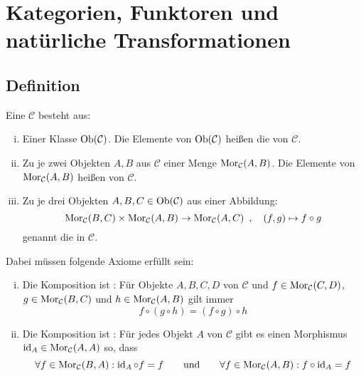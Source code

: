 \tableofcontents
\cleardoubleoddemptypage

\setcounter{page}{1}

\section{Kategorien, Funktoren und natürliche Transformationen} %
\label{sec:1}

\subsection[Definition: Kategorie]{Definition} %
\label{sub:11}
Eine  $\mathcal{C}$ besteht aus:
\begin{enumerate}[i)]
	\item Einer Klasse $\operatorname{Ob}(\mathcal{C})$. Die Elemente von $\operatorname{Ob}(\mathcal{C})$ heißen die  von $\mathcal{C}$.
	\item Zu je zwei Objekten $A,B$ aus $\mathcal{C}$ einer Menge $\operatorname{Mor}_{\mathcal{C}}(A,B)$. Die Elemente von $\operatorname{Mor}_\mathcal{C}(A,B)$ heißen  von
	$\mathcal{C}$.
	\item Zu je drei Objekten $A,B,C \in \operatorname{Ob}(\mathcal{C})$ aus einer Abbildung: 
	\[
		\operatorname{Mor}_\mathcal{C}(B,C) \times \operatorname{Mor}_\mathcal{C}(A,B) \to \operatorname{Mor}_\mathcal{C}(A,C) \enspace, \quad (f,g) \mapsto f \circ g
	\]
	genannt die  in $\mathcal{C}$. 
\end{enumerate}
Dabei müssen folgende Axiome  erfüllt sein:
\begin{enumerate}[(i)]
	\item Die Komposition ist : Für Objekte $A,B,C,D$ von $\mathcal{C}$ und 
	$f \in \operatorname{Mor}_\mathcal{C}(C,D)$, $ g \in \operatorname{Mor}_\mathcal{C}(B,C)$ und $ h \in \operatorname{Mor}_\mathcal{C}(A,B)$ gilt immer
	\[
		f \circ (g \circ h) = (f \circ g) \circ h
	\]
	\item Die Komposition ist : Für jedes Objekt $A$ von $\mathcal{C}$ gibt es einen Morphismus $\operatorname{id}_A \in \operatorname{Mor}_\mathcal{C}(A,A)$ so, dass
	\[
		\forall f \in \operatorname{Mor}_\mathcal{C}(B,A) : \operatorname{id}_A \circ f = f  \qquad  \text{und} \qquad  \forall f \in \operatorname{Mor}_\mathcal{C}(A,B) : f \circ \operatorname{id}_A = f
	\]
\end{enumerate}

